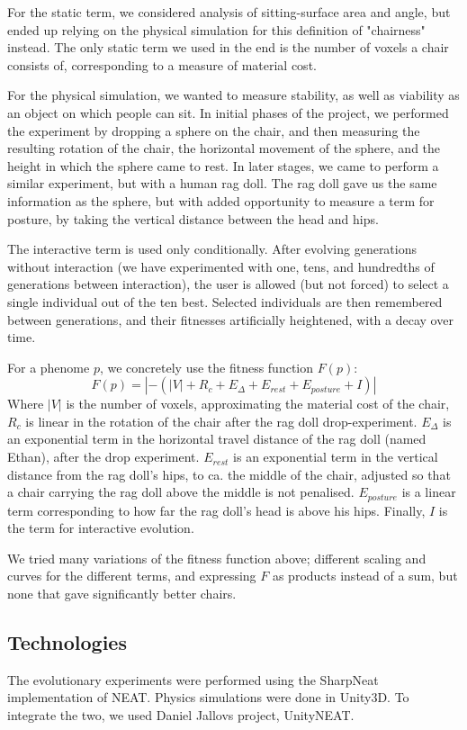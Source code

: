 For the static term, we considered analysis of sitting-surface area and angle,
but ended up relying on the physical simulation for this definition of
"chairness" instead. The only static term we used in the end is the number of
voxels a chair consists of, corresponding to a measure of material cost.

For the physical simulation, we wanted to measure stability, as well as
viability as an object on which people can sit. In initial phases of the
project, we performed the experiment by dropping a sphere on the chair, and then
measuring the resulting rotation of the chair, the horizontal movement of the
sphere, and the height in which the sphere came to rest. In later stages, we
came to perform a similar experiment, but with a human rag doll. The rag doll
gave us the same information as the sphere, but with added opportunity to
measure a term for posture, by taking the vertical distance between the head and
hips.

The interactive term is used only conditionally. After evolving generations
without interaction (we have experimented with one, tens, and hundredths of
generations between interaction), the user is allowed (but not forced) to select
a single individual out of the ten best. Selected individuals are then
remembered between generations, and their fitnesses artificially heightened,
with a decay over time.

For a phenome $p$, we concretely use the fitness function $F(p)$:
$$F(p) = \left|-(\left|V\right| + R_c + E_{\Delta} + E_{rest} + E_{posture} +
I)\right|$$
Where $|V|$ is the number of voxels, approximating the material cost of the
chair, $R_c$ is linear in the rotation of the chair after the rag doll
drop-experiment. $E_{\Delta}$ is an exponential term in the horizontal travel
distance of the rag doll (named Ethan), after the drop experiment. $E_{rest}$ is
an exponential term in the vertical distance from the rag doll's hips, to ca.
the middle of the chair, adjusted so that a chair carrying the rag doll above
the middle is not penalised. $E_{posture}$ is a linear term corresponding to how
far the rag doll's head is above his hips. Finally, $I$ is the term for
interactive evolution.

We tried many variations of the fitness function above; different scaling and
curves for the different terms, and expressing $F$ as products instead of a
sum, but none that gave significantly better chairs.

\subsection{Technologies}
The evolutionary experiments were performed using the
SharpNeat\cite{web:sharpneat} implementation of NEAT. Physics simulations were
done in Unity3D\cite{web:unity}. To integrate the two, we used Daniel Jallovs project, UnityNEAT\cite{web:unityneat}.

